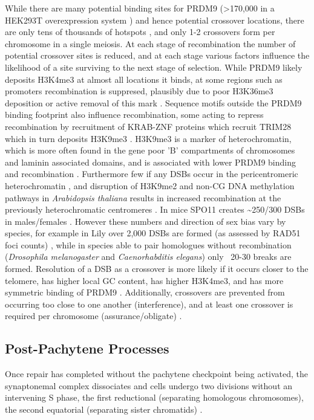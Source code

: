 While there are many potential binding sites for PRDM9 (>170,000 in a HEK293T overexpression system \cite{Altemose2017map}) and hence potential crossover locations, there are only tens of thousands of hotspots \parencite{Myers2005FineScale, Pratto2014Recombination}, and only 1-2 crossovers form per chromosome in a single meiosis.
At each stage of recombination the number of potential crossover sites is reduced, and at each stage various factors influence the likelihood of a site surviving to the next stage of selection.
While PRDM9 likely deposits H3K4me3 at almost all locations it binds, at some regions such as promoters recombination is suppresed, plausibly due to poor H3K36me3 deposition or active removal of this mark \parencite{Altemose2017map}.
Sequence motifs outside the PRDM9 binding footprint also influence recombination, some acting to repress recombination by recruitment of KRAB-ZNF proteins which recruit TRIM28 which in turn deposits H3K9me3 \parencite{Altemose2017map}.
H3K9me3 is a marker of heterochromatin, which is more often found in the gene poor 'B' compartments of chromosomes and laminin associated domains, and is associated with lower PRDM9 binding and recombination \parencite{Walker2015Affinityseq,Patel2019Dynamic,Yamada2017Genomic}.
Furthermore few if any DSBs occur in the pericentromeric heterochromatin \parencite{Verver2013Role}, and disruption of H3K9me2 and non-CG DNA methylation pathways in \textit{Arabidopsis thaliana} results in increased recombination at the previously heterochromatic centromeres \parencite{Underwood2018Epigenetic}.
In mice SPO11 creates \textasciitilde250/300 DSBs in males/females \parencite{Baudat2007Regulating}.
However these numbers and direction of sex bias vary by species, for example in Lily over 2,000 DSBs are formed (as assessed by RAD51 foci counts) \parencite{Terasawa1995Localization}, while in species able to pair homologues without recombination (\textit{Drosophila melanogaster} and \textit{Caenorhabditis elegans}) only ~20-30 breaks are formed.
Resolution of a DSB as a crossover is more likely if it occurs closer to the telomere, has higher local GC content, has higher H3K4me3, and has more symmetric binding of PRDM9 \parencite{Hinch2019Factors}.
Additionally, crossovers are prevented from occurring too close to one another (interference), and at least one crossover is required per chromosome (assurance/obligate) \parencite{Fledel-Alon2009BroadScale, Hunter2015Meiotic, Otto2019Crossover}.



\subsection{Post-Pachytene Processes}
Once repair has completed without the pachytene checkpoint being activated, the synaptonemal complex dissociates and cells undergo two divisions without an intervening S phase, the first reductional (separating homologous chromosomes), the second equatorial (separating sister chromatids) \parencite{Roeder2000pachytene, Subramanian2014Meiotic, Watanabe2012Geometry}.

